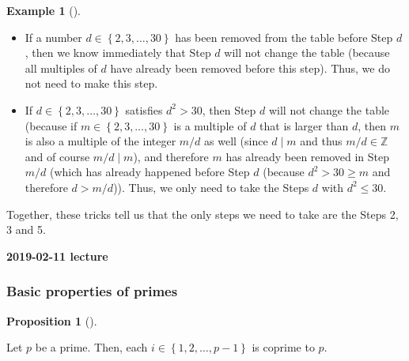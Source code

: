 \documentclass[numbers=enddot,12pt,final,onecolumn,notitlepage]{scrartcl}%
\numberwithin{exer}{subsection}
\theoremstyle{definition}
\newtheorem{prop}[theo]{Proposition}
\newenvironment{proposition}[1][]
{\begin{prop}[#1]\begin{leftbar}}
{\end{leftbar}\end{prop}}
\newtheorem{exam}[theo]{Example}
\newenvironment{example}[1][]
{\begin{exam}[#1]\begin{leftbar}}
{\end{leftbar}\end{exam}}
\begin{document}
\begin{example}
\begin{itemize}
\item If a number $d\in\left\{  2,3,\ldots,30\right\}  $ has been removed from
the table before Step $d$, then we know immediately that Step $d$ will not
change the table (because all multiples of $d$ have already been removed
before this step). Thus, we do not need to make this step.

\item If $d\in\left\{  2,3,\ldots,30\right\}  $ satisfies $d^{2}>30$, then
Step $d$ will not change the table (because if $m\in\left\{  2,3,\ldots
,30\right\}  $ is a multiple of $d$ that is larger than $d$, then $m$ is also
a multiple of the integer $m/d$ as well (since $d\mid m$ and thus
$m/d\in\mathbb{Z}$ and of course $m/d\mid m$), and therefore $m$ has already
been removed in Step $m/d$ (which has already happened before Step $d$
(because $d^{2}>30\geq m$ and therefore $d>m/d$)). Thus, we only need to take
the Steps $d$ with $d^{2}\leq30$.
\end{itemize}

Together, these tricks tell us that the only steps we need to take are the
Steps 2, 3 and 5.
\end{example}

\begin{center}
\textbf{2019-02-11 lecture}
\end{center}

\subsubsection{Basic properties of primes}

\begin{proposition}
\label{prop.ent.primes.each-i-coprime}Let $p$ be a prime. Then, each
$i\in\left\{  1,2,\ldots,p-1\right\}  $ is coprime to $p$.
\end{proposition}
\end{document}
